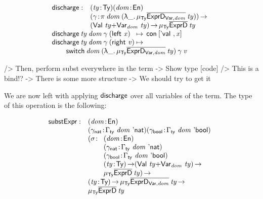 \[\stk{
\begin{array}{@{}ll}
\discharge : & \PITEL{\V{ty}}{\Ty}
               \PITEL{\V{dom}}{\EnumU} \\
             & \PI{\V{\gamma}}{\spi{\V{dom}}{(\LAM{\_} \IMu{\Ty}{\toIDesc{\HExprVarD{\V{dom}}}}{\V{ty}})}} \\
             & (\SUM{\Val{\V{ty}}}{\Var{\V{dom}}{\V{ty}}}) \To
               \IMu{\Ty}{\toIDesc{\HExprD}}{\V{ty}} 
\end{array} \\
\begin{array}{@{}l@{\:\mapsto\:\:}l}
\discharge\: \V{ty}\: \V{dom}\: \V{\gamma}\: (\SumLeft \V{x})  & \Con{\pair{\Eval{}}{\V{x}}{}} \\
\discharge\: \V{ty}\: \V{dom}\: \V{\gamma}\: (\SumRight \V{v}) &
\end{array}\\
\qquad\switch{\V{dom}}{(\LAM{\_}
\IMu{\Ty}{\toIDesc{\HExprVarD{\V{dom}}}}{\V{ty}})}{\V{\gamma}}{\V{v}}
}\]

\begin{wstructure}
            /> Then, perform subst everywhere in the term
                -> Show type [code]
                /> This is a bind!?
                -> There is some more structure 
                    -> We should try to get it
\end{wstructure}

We are now left with applying $\discharge$ over all variables of the
term. The type of this operation is the following:

\newcommand{\substH}{\F{substExpr}}
\newcommand{\domNat}{dom_{\CN{nat}}}
\newcommand{\domBool}{dom_{\CN{bool}}}
\newcommand{\gammaNat}{\V{\ensuremath{\gamma_{\CN{nat}}}}}
\newcommand{\gammaBool}{\V{\ensuremath{\gamma_{\CN{bool}}}}}
\newcommand{\GammaSpi}[2]{\F{\ensuremath{\Gamma_{\CN{ty}}}}~#1~#2}

\[
\begin{array}{@{}ll}
\substH  : & \PITEL{\V{dom}}{\EnumU} \\
           & \PITEL{\V{\gammaNat}}{\GammaSpi{\V{dom}}{\Enat}} 
             \PITEL{\V{\gammaBool}}{\GammaSpi{\V{dom}}{\Ebool}} \\
           & \begin{array}{@{}ll}
             \PI{\V{\sigma}}{& \PITEL{\V{dom}}{\EnumU} \\
                             & \PITEL{\V{\gammaNat}}
                                     {\GammaSpi{\V{dom}}{\Enat}} \\
                             & \PITEL{\V{\gammaBool}}
                                     {\GammaSpi{\V{dom}}{\Ebool}} \\
                             & \PI{\V{ty}}{\Ty} (\SUM{\Val{\V{ty}}}{\Var{\V{dom}}{\V{ty}}}) \To \\
                             & \IMu{\Ty}{\toIDesc{\HExprD}}{\V{ty}}}
             \end{array}\\
          & \PI{\V{ty}}{\Ty}
            \IMu{\Ty}{\toIDesc{\HExprVarD{\V{dom}}}}{\V{ty}} \To \\
          & \IMu{\Ty}{\toIDesc{\HExprD}}{\V{ty}}
\end{array}
\]


